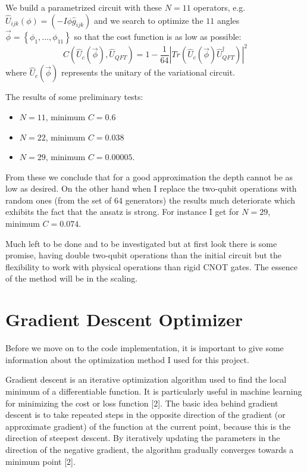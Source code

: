 \documentclass[inscr,ack,preface]{diphdthesis}
\begin{document}
We build a parametrized circuit with these $N=11$ operators, e.g. $\hat{U}_{ijk}\left(\phi\right)=\left(-I \phi \hat{g}_{ijk}\right)$ and we search to optimize the $11$ angles $\vec{\phi}=\left\{\phi_1,\ldots, \phi_{11}\right\}$ so that the cost function is as low as possible:
\begin{equation}
C\left(\hat{U}_c\left(\vec{\phi}\right), \hat{U}_{QFT}\right)=1-\frac{1}{64}\left|Tr\left(\hat{U}_c\left(\vec{\phi}\right)\hat{U}_{QFT}^{\dagger} \right)\right|^2
\end{equation}
where $\hat{U}_c\left(\vec{\phi}\right)$ represents the unitary of the variational circuit.

The results of some preliminary tests:
\begin{itemize}
	\item $N=11$, minimum $C=0.6$
	\item $N=22$, minimum $C=0.038$
	\item $N=29$, minimum $C=0.00005$.
\end{itemize}
From these we conclude that for a good approximation the depth cannot be as low as desired.
On the other hand when I replace the two-qubit operations with random ones (from the set of $64$ generators) the 
results much deteriorate which exhibits the fact that the ansatz is strong. For instance I get for $N=29$, minimum $C=0.074$.

Much left to be done and to be investigated but at first look there is some promise, having double two-qubit operations
than the initial circuit but the flexibility to work with physical operations than rigid CNOT gates.
The essence of the method will be in the scaling.


\section{Gradient Descent Optimizer}

Before we move on to the code implementation, it is important to give some information about the optimization method I used for this project. 

Gradient descent is an iterative optimization algorithm used to find the local minimum of a differentiable function. It is particularly useful in machine learning for minimizing the cost or loss function [2]. The basic idea behind gradient descent is to take repeated steps in the opposite direction of the gradient (or approximate gradient) of the function at the current point, because this is the direction of steepest descent. By iteratively updating the parameters in the direction of the negative gradient, the algorithm gradually converges towards a minimum point [2].
\end{document}
